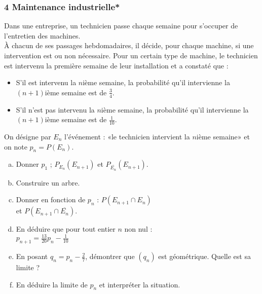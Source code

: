 \documentclass[a4paper,11pt]{article} \usepackage{FBarticle} \mapage{831}{Probabilités 1} %
\begin{document}
\begin{multicols}{2}
\subsubsection*{4 Maintenance industrielle*}
Dans une entreprise, un technicien passe chaque semaine pour s'occuper de l'entretien des machines.\\
À chacun de ses passages hebdomadaires, il décide, pour chaque machine, si une intervention est ou non nécessaire. 
Pour un certain type de machine, le technicien est intervenu la première semaine de leur installation et a constaté que :
\begin{itemize}
\item S'il est intervenu la $n$ième semaine, la probabilité qu'il intervienne la $(n+1)$ième semaine est de $\frac{3}{4}$.
\item S'il n'est pas intervenu la $n$ième semaine, la probabilité qu'il intervienne la $(n+1)$ième semaine est de $\frac{1}{10}$.
\end{itemize}
On désigne par $E_n$ l'événement : «le technicien intervient la $n$ième semaine» et on note $p_n=P(E_n)$.
\begin{enumerate}[a)]
\item Donner $p_1$ ; $P_{E_n}(E_{n+1})$ et $P_{\overline{E_n}}(E_{n+1})$.
\item Construire un arbre.
\item Donner en fonction de $p_n$ : $P(E_{n+1}\cap E_n)$\\ et $P(E_{n+1}\cap\overline{E_n})$.
\item En déduire que pour tout entier $n$ non nul :\\ $p_{n+1}=\frac{13}{20}p_n-\frac{1}{10}$
\item En posant $q_n=p_n-\frac{2}{7}$, démontrer que $(q_n)$ est géométrique. Quelle est sa limite ?
\item En déduire la limite de $p_n$ et interpréter la situation.
\end{enumerate}





\end{multicols}
\end{document}
